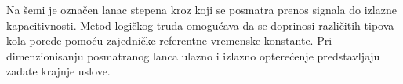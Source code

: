 Na šemi je označen lanac stepena kroz koji se posmatra prenos signala do izlazne kapacitivnosti. Metod logičkog truda omogućava da se doprinosi različitih tipova kola porede pomoću zajedničke referentne vremenske konstante. Pri dimenzionisanju posmatranog lanca ulazno i izlazno opterećenje predstavljaju zadate krajnje uslove.
